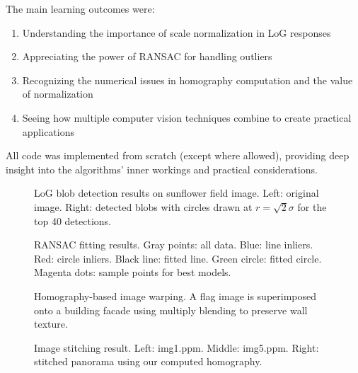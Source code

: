 \documentclass[11pt,a4paper]{article}
\begin{document}
The main learning outcomes were:
\begin{enumerate}
    \item Understanding the importance of scale normalization in LoG responses
    \item Appreciating the power of RANSAC for handling outliers
    \item Recognizing the numerical issues in homography computation and the value of normalization
    \item Seeing how multiple computer vision techniques combine to create practical applications
\end{enumerate}

All code was implemented from scratch (except where allowed), providing deep insight into the algorithms' inner workings and practical considerations.


\begin{figure}[H]
    \centering
    \caption{LoG blob detection results on sunflower field image. Left: original image. Right: detected blobs with circles drawn at $r = \sqrt{2}\sigma$ for the top 40 detections.}
    \label{fig:blob_detection}
\end{figure}

\begin{figure}[H]
    \centering
    \caption{RANSAC fitting results. Gray points: all data. Blue: line inliers. Red: circle inliers. Black line: fitted line. Green circle: fitted circle. Magenta dots: sample points for best models.}
    \label{fig:ransac}
\end{figure}

\begin{figure}[H]
    \centering
    \caption{Homography-based image warping. A flag image is superimposed onto a building facade using multiply blending to preserve wall texture.}
    \label{fig:homography}
\end{figure}

\begin{figure}[H]
    \centering
    \caption{Image stitching result. Left: img1.ppm. Middle: img5.ppm. Right: stitched panorama using our computed homography.}
    \label{fig:stitching}
\end{figure}
\end{document}
